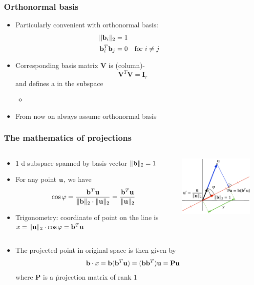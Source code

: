 \documentclass[t]{beamer} %
\begin{document}
\begin{frame}
  \frametitle{Orthonormal basis}

  \begin{itemize}
  \item Particularly convenient with orthonormal basis:
    \begin{align*}
      \norm[2]{\vb_i} &= 1 \\
      \vb_i^T \vb_j &= 0 && \text{for } i\neq j
    \end{align*}
  \item Corresponding basis matrix $\mathbf{V}$ is (column)-
    \[
      \mathbf{V}^T \mathbf{V} = \mathbf{I}_r
    \]
    and defines a  in the subspace
    \begin{itemize}
    \item[]
    \end{itemize}
  \item<2->[\hand] From now on always assume orthonormal basis
  \end{itemize}
\end{frame}

\begin{frame}
  \frametitle{The mathematics of projections}

  \begin{columns}[c]
    \begin{column}{50mm}
      \begin{itemize}
      \item 1-d subspace spanned by basis vector
        $\norm[2]{\vb} = 1$
      \item For any point $\vu$, we have
        \[
          \cos \varphi
          = \frac{\vb^T \vu}{\norm[2]{\vb}\cdot \norm[2]{\vu}}
          = \frac{\vb^T \vu}{\norm[2]{\vu}}          
        \]
      \item<2-> Trigonometry: coordinate of point on the line is
        $x = \norm[2]{\vu}\cdot \cos\varphi = \vb^T \vu$
      \end{itemize}
    \end{column}
    \begin{column}{50mm}
      \includegraphics[width=50mm]{img/7_cosine_projection}
    \end{column}
  \end{columns}
  
  \begin{itemize}
  \item<3-> The projected point in original space is then given by
    \[
      \vb\cdot x = \vb (\vb^T \vu) = (\vb \vb^T) \vu = \mathbf{P} \vu
    \]
    where $\mathbf{P}$ is a \h{projection matrix} of rank 1
  \end{itemize}
\end{frame}
\end{document}

